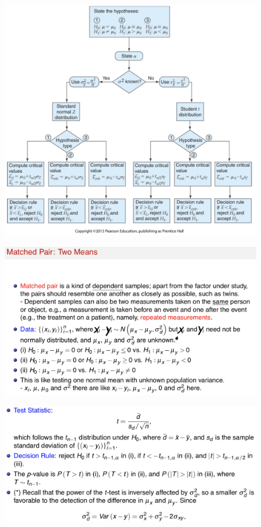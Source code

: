 \documentclass[14pt]{extarticle}
\begin{document}
\begin{figure}[H]
    \centering
    \includegraphics[width=1\textwidth]{fig8.png}
\end{figure}

\begin{figure}[H]
    \centering
    \includegraphics[width=1\textwidth]{fig9.png}
\end{figure}

\begin{figure}[H]
    \centering
    \includegraphics[width=1\textwidth]{fig10.png}
\end{figure}
\end{document}
